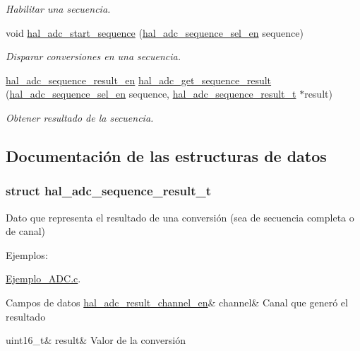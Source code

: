 \begin{DoxyCompactItemize}
\begin{DoxyCompactList}\small\item\em Habilitar una secuencia. \end{DoxyCompactList}\item 
void \hyperlink{group__ADC_ga154950a81b5f589fde0139178ab1dcf3}{hal\+\_\+adc\+\_\+start\+\_\+sequence} (\hyperlink{group__ADC_ga9297d7b14d7018a94bce94f0103d8559}{hal\+\_\+adc\+\_\+sequence\+\_\+sel\+\_\+en} sequence)
\begin{DoxyCompactList}\small\item\em Disparar conversiones en una secuencia. \end{DoxyCompactList}\item 
\hyperlink{group__ADC_ga7761986f9c56b809bce1299c6c32eddd}{hal\+\_\+adc\+\_\+sequence\+\_\+result\+\_\+en} \hyperlink{group__ADC_gaf58fbae95e4083bddf74495df7709674}{hal\+\_\+adc\+\_\+get\+\_\+sequence\+\_\+result} (\hyperlink{group__ADC_ga9297d7b14d7018a94bce94f0103d8559}{hal\+\_\+adc\+\_\+sequence\+\_\+sel\+\_\+en} sequence, \hyperlink{group__ADC_structhal__adc__sequence__result__t}{hal\+\_\+adc\+\_\+sequence\+\_\+result\+\_\+t} $\ast$result)
\begin{DoxyCompactList}\small\item\em Obtener resultado de la secuencia. \end{DoxyCompactList}\end{DoxyCompactItemize}


\subsection{Documentación de las estructuras de datos}
\label{structhal__adc__sequence__result__t}
\subsubsection{struct hal\+\_\+adc\+\_\+sequence\+\_\+result\+\_\+t}
Dato que representa el resultado de una conversión (sea de secuencia completa o de canal) \begin{Desc}
\item[Ejemplos\+: ]\par
\hyperlink{Ejemplo_ADC_8c-example}{Ejemplo\+\_\+\+A\+D\+C.\+c}.\end{Desc}
\begin{DoxyFields}{Campos de datos}
\mbox{\label{group__ADC_a14b46f8d352b49c5be28cad8aafff2ba}} 
\hyperlink{group__ADC_ga99371f47be5b6b4b61c32a1ea86f2b6c}{hal\_adc\_result\_channel\_en}&
channel&
Canal que generó el resultado \\
\hline

\mbox{\label{group__ADC_a0971e3d432b7f1f283620cab047a7275}} 
uint16\_t&
result&
Valor de la conversión \\
\hline

\end{DoxyFields}



